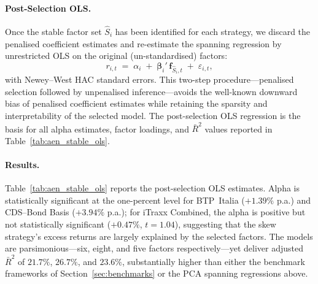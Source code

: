 \paragraph{Post-Selection OLS.}

Once the stable factor set $\hat{S}_i$ has been identified for each
strategy, we discard the penalised coefficient estimates and
re-estimate the spanning regression by unrestricted OLS on the
original (un-standardised) factors:
\begin{equation}\label{eq:post_ols}
r_{i,t} \;=\; \alpha_i \;+\; \boldsymbol{\beta}_i'\,
\mathbf{f}_{\hat{S}_i,t} \;+\; \varepsilon_{i,t},
\end{equation}
with Newey--West HAC standard errors. This two-step
procedure---penalised selection followed by unpenalised
inference---avoids the well-known downward bias of penalised
coefficient estimates while retaining the sparsity and interpretability
of the selected model. The post-selection OLS regression is the basis
for all alpha estimates, factor loadings, and $\bar{R}^2$ values
reported in Table~\ref{tab:aen_stable_ols}.

\paragraph{Results.}
 
Table~\ref{tab:aen_stable_ols} reports the post-selection OLS
estimates. Alpha is statistically significant at the one-percent
level for BTP~Italia ($+1.39\%$ p.a.) and CDS--Bond
Basis ($+3.94\%$ p.a.); for iTraxx Combined, the
alpha is positive but not statistically significant ($+0.47\%$,
$t = 1.04$), suggesting that the skew strategy's excess returns are
largely explained by the selected factors. The models are
parsimonious---six, eight, and five factors respectively---yet
deliver adjusted $\bar{R}^2$ of $21.7\%$, $26.7\%$, and $23.6\%$,
substantially higher than either the benchmark frameworks of
Section~\ref{sec:benchmarks} or the PCA spanning regressions above.
 
